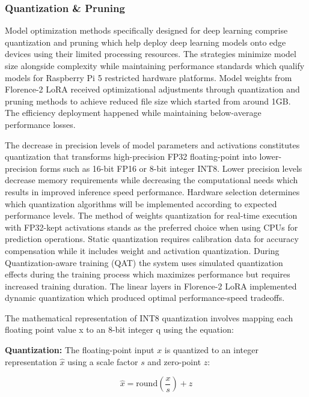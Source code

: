 \documentclass[fleqn,10pt,lineno]{wlpeerj}
\begin{document}
\subsubsection{Quantization \& Pruning}

Model optimization methods specifically designed for deep learning comprise quantization and pruning which help deploy deep learning models onto edge devices using their limited processing resources. The strategies minimize model size alongside complexity while maintaining performance standards which qualify models for Raspberry Pi 5 restricted hardware platforms. Model weights from Florence-2 LoRA received optimizational adjustments through quantization and pruning methods to achieve reduced file size which started from around 1GB. The efficiency deployment happened while maintaining below-average performance losses.  

The decrease in precision levels of model parameters and activations constitutes quantization that transforms high-precision FP32 floating-point into lower-precision forms such as 16-bit FP16 or 8-bit integer INT8. Lower precision levels decrease memory requirements while decreasing the computational needs which results in improved inference speed performance. Hardware selection determines which quantization algorithms will be implemented according to expected performance levels. The method of weights quantization for real-time execution with FP32-kept activations stands as the preferred choice when using CPUs for prediction operations. Static quantization requires calibration data for accuracy compensation while it includes weight and activation quantization. During Quantization-aware training (QAT) the system uses simulated quantization effects during the training process which maximizes performance but requires increased training duration. The linear layers in Florence-2 LoRA implemented dynamic quantization which produced optimal performance-speed tradeoffs.  

The mathematical representation of INT8 quantization involves mapping each floating point value x to an 8-bit integer q using the equation:  

\textbf{Quantization:} The floating-point input $x$ is quantized to an integer representation $\hat{x}$ using a scale factor $s$ and zero-point $z$:

\begin{equation}
\hat{x} = \text{round}\left( \frac{x}{s} \right) + z
\end{equation}
\end{document}
